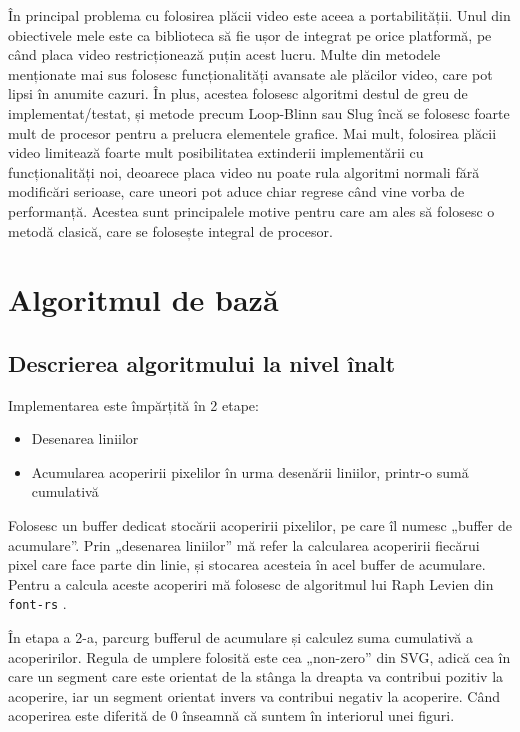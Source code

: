 \documentclass[a4paper, 12pt]{report}
\begin{document}
În principal problema cu folosirea plăcii video este aceea a portabilității. Unul din obiectivele mele este ca biblioteca să
fie ușor de integrat pe orice platformă, pe când placa video restricționează puțin acest lucru. Multe din metodele
menționate mai sus folosesc funcționalități avansate ale plăcilor video, care pot lipsi în anumite cazuri. În plus, acestea
folosesc algoritmi destul de greu de implementat/testat, și metode precum Loop-Blinn sau Slug încă se folosesc foarte mult
de procesor pentru a prelucra elementele grafice. Mai mult, folosirea plăcii video limitează foarte mult posibilitatea extinderii
implementării cu funcționalități noi, deoarece placa video nu poate rula algoritmi normali fără modificări serioase, care uneori
pot aduce chiar regrese când vine vorba de performanță. Acestea sunt principalele motive pentru care am ales să folosesc o
metodă clasică, care se folosește integral de procesor.

\chapter{Algoritmul de bază}

\section{Descrierea algoritmului la nivel înalt}

Implementarea este împărțită în 2 etape:

\begin{itemize}
    \item{Desenarea liniilor}
    \item{Acumularea acoperirii pixelilor în urma desenării liniilor, printr-o sumă cumulativă}
\end{itemize}

Folosesc un buffer dedicat stocării acoperirii pixelilor, pe care îl numesc „buffer de acumulare”. Prin „desenarea liniilor”
mă refer la calcularea acoperirii fiecărui pixel care face parte din linie, și stocarea acesteia în acel buffer de acumulare.
Pentru a calcula aceste acoperiri mă folosesc de algoritmul lui Raph Levien din \texttt{font-rs} \cite{fastest_font_renderer_in_the_world}.

În etapa a 2-a, parcurg bufferul de acumulare și calculez suma cumulativă a acoperirilor. Regula de umplere folosită este cea
„non-zero” din SVG, adică cea în care un segment care este orientat de la stânga la dreapta va contribui pozitiv la acoperire,
iar un segment orientat invers va contribui negativ la acoperire. Când acoperirea este diferită de 0 înseamnă că suntem în
interiorul unei figuri.
\end{document}
